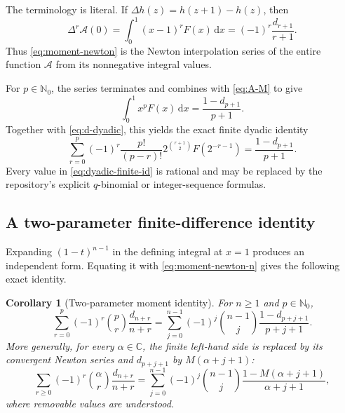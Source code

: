 \documentclass[11pt,oneside]{article}
\newtheorem{corollary}[theorem]{Corollary}
\theoremstyle{definition}
\theoremstyle{remark}
\newcommand{\C}{\mathbb C}
\newcommand{\N}{\mathbb N}
\newcommand{\dd}{\,\mathrm d}
\newcommand{\1}{\mathbf 1}
\begin{document}
The terminology is literal.  If \(\Delta h(z)=h(z+1)-h(z)\), then
\begin{equation}
 \Delta^r\mathcal A(0)
 =\int_0^1(x-1)^rF(x)\dd x
 =(-1)^r\frac{d_{r+1}}{r+1}.                                  \label{eq:Newton-difference}
\end{equation}
Thus \eqref{eq:moment-newton} is the Newton interpolation series of the entire
function \(\mathcal A\) from its nonnegative integral values.

For \(p\in\N_0\), the series terminates and combines with \eqref{eq:A-M} to
give
\begin{equation}
 \boxed{\quad
 \int_0^1x^pF(x)\dd x=\frac{1-d_{p+1}}{p+1}.
 \quad}                                                        \label{eq:integer-definite}
\end{equation}
Together with \eqref{eq:d-dyadic}, this yields the exact finite dyadic identity
\begin{equation}
 \sum_{r=0}^{p}(-1)^r\frac{p!}{(p-r)!}
 2^{\binom{r+1}{2}}F(2^{-r-1})
 =\frac{1-d_{p+1}}{p+1}.                                      \label{eq:dyadic-finite-id}
\end{equation}
Every value in \eqref{eq:dyadic-finite-id} is rational and may be replaced by
the repository's explicit \(q\)-binomial or integer-sequence formulas.

\subsection{A two-parameter finite-difference identity}
Expanding \((1-t)^{n-1}\) in the defining integral at \(x=1\) produces an
independent form.  Equating it with \eqref{eq:moment-newton-n} gives the
following exact identity.

\begin{corollary}[Two-parameter moment identity]\label{cor:two-param}
For \(n\geq1\) and \(p\in\N_0\),
\begin{equation}
 \boxed{\quad
 \sum_{r=0}^{p}(-1)^r\binom pr\frac{d_{n+r}}{n+r}
 =\sum_{j=0}^{n-1}(-1)^j\binom{n-1}{j}
 \frac{1-d_{p+j+1}}{p+j+1}.
 \quad}                                                        \label{eq:two-param-id}
\end{equation}
More generally, for every \(\alpha\in\C\), the finite left-hand side is
replaced by its convergent Newton series and \(d_{p+j+1}\) by
\(M(\alpha+j+1)\):
\begin{equation}
 \sum_{r\geq0}(-1)^r\binom\alpha r\frac{d_{n+r}}{n+r}
 =\sum_{j=0}^{n-1}(-1)^j\binom{n-1}{j}
 \frac{1-M(\alpha+j+1)}{\alpha+j+1},                           \label{eq:two-param-entire}
\end{equation}
where removable values are understood.
\end{corollary}
\end{document}
